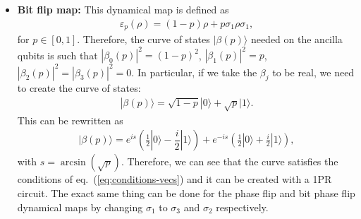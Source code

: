 \documentclass[10pt,letterpaper]{article} %
\newcommand{\eref}[1]{eq.~(\ref{#1})}
\begin{document}
\begin{itemize}
\item \textbf{Bit flip map:} 
This dynamical map is defined as
\begin{align*}
\varepsilon_p(\rho) = (1-p)\rho + p\sigma_1 \rho \sigma_1,
\end{align*}
for $p \in [0,1]$. 
Therefore, the curve of states $|\beta(p)\rangle$ needed on the ancilla
qubits is such that 
$|\beta_0(p)|^2= (1-p)^2$, $|\beta_1(p)|^2 = p$, $|\beta_2(p)|^2 = |\beta_3(p)|^2 = 0$.
In particular, if we take the $\beta_j$ to be real,
we need to create the curve of states:
\begin{align*}
|\beta(p)\rangle = \sqrt{1-p} |0\rangle +\sqrt{p} |1\rangle.
\end{align*}
This can be rewritten as
\begin{align*}
|\beta(p) \rangle = e^{is}  \left(\frac{1}{2} |0\rangle - \dfrac{i}{2} |1\rangle \right) + e^{-is} \left( \frac{1}{2} |0\rangle + \frac{i}{2} |1\rangle \right),
\end{align*}
with $s= \arcsin(\sqrt{p})$.
Therefore, we can see that the curve satisfies the conditions of  \eref{eq:conditions-vecs} 
and it can be created with a 1PR circuit.
The exact same thing can be done
for the phase flip and bit phase flip dynamical maps by
changing $\sigma_1$ to
$\sigma_3$ and $\sigma_2$ respectively.


\end{itemize}
\end{document}
